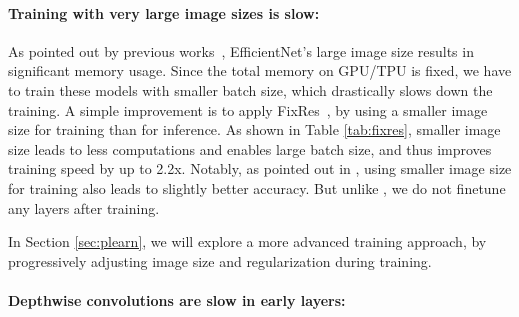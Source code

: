 \documentclass{article}
\begin{document}
\paragraph{Training with very large image sizes is slow:}
As pointed out by previous works~\cite{regnet20}, EfficientNet's large image size results in significant memory usage. Since the total memory on GPU/TPU is fixed, we have to train these models with smaller batch size, which drastically slows down the training. A simple improvement is to apply FixRes~\cite{fixres20}, by using a smaller image size for training than for inference. As shown in Table \ref{tab:fixres}, smaller image size leads to less computations and enables large batch size,  and thus improves training speed by up to 2.2x. Notably, as pointed out in \cite{fixefficientnet20,nfnet21}, using smaller image size for training also leads to slightly better accuracy. But unlike \cite{fixres20}, we do not finetune any layers after training.

\begin{table}[h]
    \vskip -0.1in
    \centering
    \caption{EfficientNet-B6 accuracy and training throughput for different batch sizes and image size.}
    \vskip -0.1in
\label{tab:fixres}
\end{table} 
In Section \ref{sec:plearn}, we will explore a more advanced training approach, by progressively adjusting image size and regularization during training. 

\paragraph{Depthwise convolutions are slow in early layers:}
\end{document}
